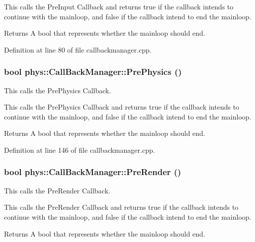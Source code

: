 This calls the PreInput Callback and returns true if the callback intends to continue with the mainloop, and false if the callback intend to end the mainloop. \begin{DoxyReturn}{Returns}
A bool that represents whether the mainloop should end. 
\end{DoxyReturn}


Definition at line 80 of file callbackmanager.cpp.

\hypertarget{classphys_1_1CallBackManager_a65867cc4855f0f8cd84a2b4a8bbf0fd6}{
\subsubsection[{PrePhysics}]{\setlength{\rightskip}{0pt plus 5cm}bool phys::CallBackManager::PrePhysics ()}}
\label{d1/d47/classphys_1_1CallBackManager_a65867cc4855f0f8cd84a2b4a8bbf0fd6}


This calls the PrePhysics Callback. 

This calls the PrePhysics Callback and returns true if the callback intends to continue with the mainloop, and false if the callback intend to end the mainloop. \begin{DoxyReturn}{Returns}
A bool that represents whether the mainloop should end. 
\end{DoxyReturn}


Definition at line 146 of file callbackmanager.cpp.

\hypertarget{classphys_1_1CallBackManager_a244c88b8a06f68a4f4bcff6253bf6806}{
\subsubsection[{PreRender}]{\setlength{\rightskip}{0pt plus 5cm}bool phys::CallBackManager::PreRender ()}}
\label{d1/d47/classphys_1_1CallBackManager_a244c88b8a06f68a4f4bcff6253bf6806}


This calls the PreRender Callback. 

This calls the PreRender Callback and returns true if the callback intends to continue with the mainloop, and false if the callback intend to end the mainloop. \begin{DoxyReturn}{Returns}
A bool that represents whether the mainloop should end. 
\end{DoxyReturn}



